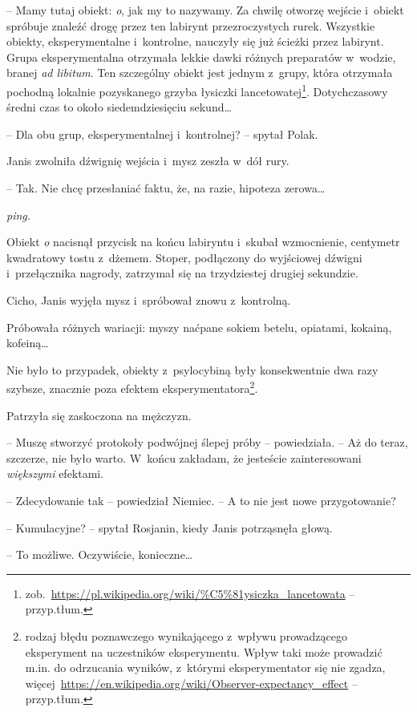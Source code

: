 \documentclass[oneside,polish,11pt,sfheadings]{mwbk}
\begin{document}
-- Mamy tutaj obiekt: \emph{o}, jak my to nazywamy. Za chwilę otworzę
wejście i~obiekt spróbuje znaleźć drogę przez ten labirynt
przezroczystych rurek. Wszystkie obiekty, eksperymentalne i~kontrolne,
nauczyły się już ścieżki przez labirynt. Grupa eksperymentalna otrzymała
lekkie dawki różnych preparatów w~wodzie, branej \emph{ad libitum}. Ten
szczególny obiekt jest jednym z~grupy, która otrzymała pochodną lokalnie
pozyskanego grzyba łysiczki lancetowatej\footnote{zob.~\url{https://pl.wikipedia.org/wiki/\%C5\%81ysiczka\_lancetowata}
-- przyp.tłum.}. Dotychczasowy średni czas to około siedemdziesięciu
sekund\ldots

-- Dla obu grup, eksperymentalnej i~kontrolnej? -- spytał Polak.

Janis zwolniła dźwignię wejścia i~mysz zeszła w~dół rury. 

-- Tak. Nie chcę przesłaniać faktu, że, na razie, hipoteza zerowa\ldots

\emph{ping.}

Obiekt \emph{o} nacisnął przycisk na końcu labiryntu i~skubał
wzmocnienie, centymetr kwadratowy tostu z~dżemem. Stoper, podłączony do
wyjściowej dźwigni i~przełącznika nagrody, zatrzymał się na trzydziestej
drugiej sekundzie.

Cicho, Janis wyjęła mysz i~spróbował znowu z~kontrolną.

Próbowała różnych wariacji: myszy naćpane sokiem betelu, opiatami,
kokainą, kofeiną\ldots

Nie było to przypadek, obiekty z~psylocybiną były konsekwentnie dwa razy
szybsze, znacznie poza efektem eksperymentatora\footnote{rodzaj błędu
poznawczego wynikającego z~wpływu prowadzącego eksperyment na
uczestników eksperymentu. Wpływ taki może prowadzić m.in. do odrzucania
wyników, z~którymi eksperymentator się nie zgadza,
więcej~\url{https://en.wikipedia.org/wiki/Observer-expectancy\_effect}
-- przyp.tłum.}.

Patrzyła się zaskoczona na mężczyzn.

-- Muszę stworzyć protokoły podwójnej ślepej próby -- powiedziała. -- Aż do
teraz, szczerze, nie było warto. W~końcu zakładam, że jesteście
zainteresowani \emph{większymi} efektami.

-- Zdecydowanie tak -- powiedział Niemiec. -- A to nie jest nowe
przygotowanie?

-- Kumulacyjne? -- spytał Rosjanin, kiedy Janis potrząsnęła głową.

-- To możliwe. Oczywiście, konieczne\ldots
\end{document}
